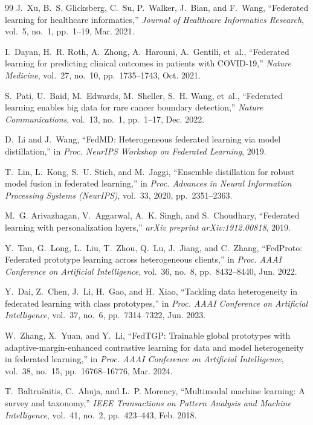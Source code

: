 \documentclass[12pt,a4paper]{amritareport}
\begin{document}
\begin{thebibliography}{99}
J.~Xu, B.~S. Glicksberg, C.~Su, P.~Walker, J.~Bian, and F.~Wang,
``Federated learning for healthcare informatics,''
\textit{Journal of Healthcare Informatics Research}, vol.~5, no.~1, pp.~1--19, Mar. 2021.

I.~Dayan, H.~R. Roth, A.~Zhong, A.~Harouni, A.~Gentili, et~al.,
``Federated learning for predicting clinical outcomes in patients with COVID-19,''
\textit{Nature Medicine}, vol.~27, no.~10, pp.~1735--1743, Oct. 2021.

S.~Pati, U.~Baid, M.~Edwards, M.~Sheller, S.~H. Wang, et~al.,
``Federated learning enables big data for rare cancer boundary detection,''
\textit{Nature Communications}, vol.~13, no.~1, pp.~1--17, Dec. 2022.

D.~Li and J.~Wang,
``FedMD: Heterogeneous federated learning via model distillation,''
in \textit{Proc. NeurIPS Workshop on Federated Learning}, 2019.

T.~Lin, L.~Kong, S.~U. Stich, and M.~Jaggi,
``Ensemble distillation for robust model fusion in federated learning,''
in \textit{Proc. Advances in Neural Information Processing Systems (NeurIPS)}, vol.~33, 2020, pp.~2351--2363.

M.~G. Arivazhagan, V.~Aggarwal, A.~K. Singh, and S.~Choudhary,
``Federated learning with personalization layers,''
\textit{arXiv preprint arXiv:1912.00818}, 2019.

Y.~Tan, G.~Long, L.~Liu, T.~Zhou, Q.~Lu, J.~Jiang, and C.~Zhang,
``FedProto: Federated prototype learning across heterogeneous clients,''
in \textit{Proc. AAAI Conference on Artificial Intelligence}, vol.~36, no.~8, pp.~8432--8440, Jun. 2022.

Y.~Dai, Z.~Chen, J.~Li, H.~Gao, and H.~Xiao,
``Tackling data heterogeneity in federated learning with class prototypes,''
in \textit{Proc. AAAI Conference on Artificial Intelligence}, vol.~37, no.~6, pp.~7314--7322, Jun. 2023.

W.~Zhang, X.~Yuan, and Y.~Li,
``FedTGP: Trainable global prototypes with adaptive-margin-enhanced contrastive learning for data and model heterogeneity in federated learning,''
in \textit{Proc. AAAI Conference on Artificial Intelligence}, vol.~38, no.~15, pp.~16768--16776, Mar. 2024.

T.~Baltru{\v{s}}aitis, C.~Ahuja, and L.~P. Morency,
``Multimodal machine learning: A survey and taxonomy,''
\textit{IEEE Transactions on Pattern Analysis and Machine Intelligence}, vol.~41, no.~2, pp.~423--443, Feb. 2018.


\end{thebibliography}
\end{document}
